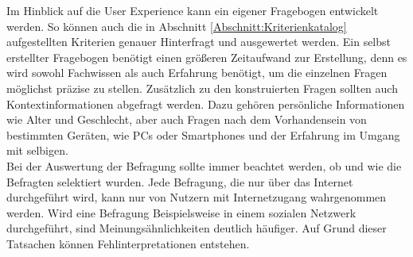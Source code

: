\begin{description}
Im Hinblick auf die User Experience kann ein eigener Fragebogen entwickelt werden. So können auch die in Abschnitt \ref{Abschnitt:Kriterienkatalog} aufgestellten Kriterien genauer Hinterfragt und ausgewertet werden. Ein selbst erstellter Fragebogen benötigt einen größeren Zeitaufwand zur Erstellung, denn es wird sowohl Fachwissen als auch Erfahrung benötigt, um die einzelnen Fragen möglichst präzise zu stellen. Zusätzlich zu den konstruierten Fragen sollten auch Kontextinformationen abgefragt werden. Dazu gehören persönliche Informationen wie Alter und Geschlecht, aber auch Fragen nach dem Vorhandensein von bestimmten Geräten, wie PCs oder Smartphones und der Erfahrung im Umgang mit selbigen. \\
Bei der Auswertung der Befragung sollte immer beachtet werden, ob und wie die Befragten selektiert wurden. Jede Befragung, die nur über das Internet durchgeführt wird, kann nur von Nutzern mit Internetzugang wahrgenommen werden. Wird eine Befragung Beispielsweise in einem sozialen Netzwerk durchgeführt, sind Meinungsähnlichkeiten deutlich häufiger. Auf Grund dieser Tatsachen können Fehlinterpretationen entstehen. 







\end{description}
